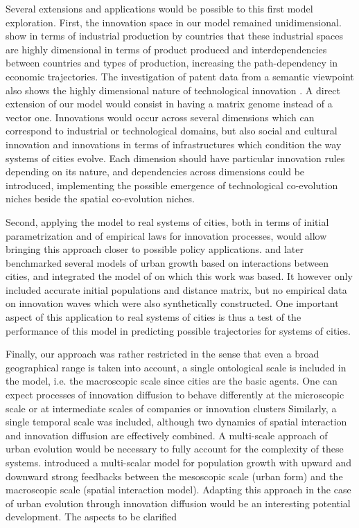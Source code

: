 \documentclass[letterpaper]{article}
\begin{document}
Several extensions and applications would be possible to this first model exploration. First, the innovation space in our model remained unidimensional. \citep{hidalgo2007product} show in terms of industrial production by countries that these industrial spaces are highly dimensional in terms of product produced and interdependencies between countries and types of production, increasing the path-dependency in economic trajectories. The investigation of patent data from a semantic viewpoint also shows the highly dimensional nature of technological innovation \citep{bergeaud2017classifying}. A direct extension of our model would consist in having a matrix genome instead of a vector one. Innovations would occur across several dimensions which can correspond to industrial or technological domains, but also social and cultural innovation and innovations in terms of infrastructures which condition the way systems of cities evolve. Each dimension should have particular innovation rules depending on its nature, and dependencies across dimensions could be introduced, implementing the possible emergence of technological co-evolution niches beside the spatial co-evolution niches.

Second, applying the model to real systems of cities, both in terms of initial parametrization and of empirical laws for innovation processes, would allow bringing this approach closer to possible policy applications. \cite{raimbault:halshs-01880492} and later \cite{2020arXiv200510007R} benchmarked several models of urban growth based on interactions between cities, and integrated the model of \cite{favaro2011gibrat} on which this work was based. It however only included accurate initial populations and distance matrix, but no empirical data on innovation waves which were also synthetically constructed. One important aspect of this application to real systems of cities is thus a test of the performance of this model in predicting possible trajectories for systems of cities.

Finally, our approach was rather restricted in the sense that even a broad geographical range is taken into account, a single ontological scale is included in the model, i.e. the macroscopic scale since cities are the basic agents. 
One can expect processes of innovation diffusion to behave differently at the microscopic scale or at intermediate scales of companies or innovation clusters %
Similarly, a single temporal scale was included, although two dynamics of spatial interaction and innovation diffusion are effectively combined. A multi-scale approach of urban evolution would be necessary to fully account for the complexity of these systems. \cite{raimbault:halshs-02351722} introduced a multi-scalar model for population growth with upward and downward strong feedbacks between the mesoscopic scale (urban form) and the macroscopic scale (spatial interaction model). Adapting this approach in the case of urban evolution through innovation diffusion would be an interesting potential development.
The aspects to be clarified
\end{document}
